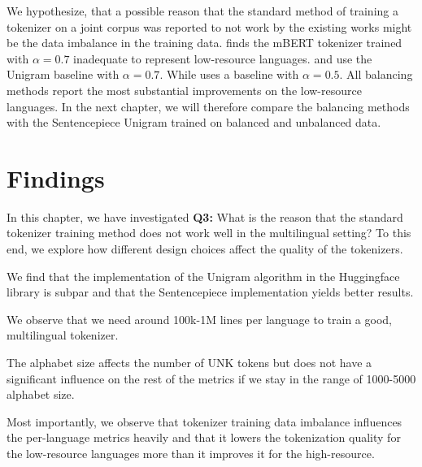 We hypothesize, that a possible reason that the standard method of training a tokenizer on a joint corpus was reported to not work by the existing works \cite{rust_how_2021,chung_improving_2020,zheng_allocating_2021,liang_xlm-v_2023} might be the data imbalance in the training data. \citet{rust_how_2021} finds the mBERT tokenizer trained with $\alpha=0.7$ inadequate to represent low-resource languages. \citet{chung_improving_2020} and \citet{zheng_allocating_2021} use the Unigram baseline with $\alpha=0.7$. While \citet{liang_xlm-v_2023} uses a baseline with $\alpha=0.5$. All balancing methods report the most substantial improvements on the low-resource languages. In the next chapter, we will therefore compare the balancing methods with the Sentencepiece Unigram trained on balanced and unbalanced data.


\section{Findings}

In this chapter, we have investigated \textbf{Q3:} What is the reason that the standard tokenizer training method does not work well in the multilingual setting? To this end, we explore how different design choices affect the quality of the tokenizers. 

We find that the implementation of the Unigram algorithm in the Huggingface library is subpar and that the Sentencepiece implementation yields better results.

We observe that we need around 100k-1M lines per language to train a good, multilingual tokenizer. 

The alphabet size affects the number of UNK tokens but does not have a significant influence on the rest of the metrics if we stay in the range of 1000-5000 alphabet size. 

Most importantly, we observe that tokenizer training data imbalance influences the per-language metrics heavily and that it lowers the tokenization quality for the low-resource languages more than it improves it for the high-resource.